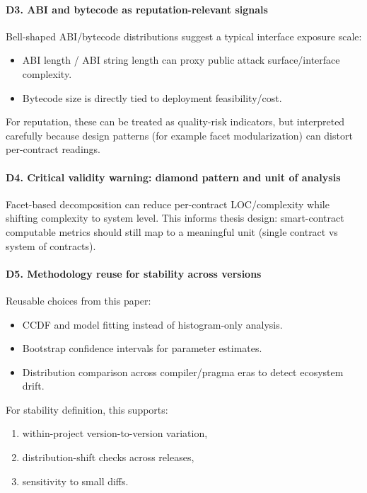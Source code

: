 \documentclass[11pt,a4paper]{article}
\begin{document}
\paragraph{D3. ABI and bytecode as reputation-relevant signals}
Bell-shaped ABI/bytecode distributions suggest a typical interface exposure scale:
\begin{itemize}[leftmargin=*]
  \item ABI length / ABI string length can proxy public attack surface/interface complexity.
  \item Bytecode size is directly tied to deployment feasibility/cost.
\end{itemize}
For reputation, these can be treated as quality-risk indicators, but interpreted carefully because design patterns (for example facet modularization) can distort per-contract readings.

\paragraph{D4. Critical validity warning: diamond pattern and unit of analysis}
Facet-based decomposition can reduce per-contract LOC/complexity while shifting complexity to system level. This informs thesis design: smart-contract computable metrics should still map to a meaningful unit (single contract vs system of contracts).

\paragraph{D5. Methodology reuse for stability across versions}
Reusable choices from this paper:
\begin{itemize}[leftmargin=*]
  \item CCDF and model fitting instead of histogram-only analysis.
  \item Bootstrap confidence intervals for parameter estimates.
  \item Distribution comparison across compiler/pragma eras to detect ecosystem drift.
\end{itemize}
For stability definition, this supports:
\begin{enumerate}[leftmargin=*]
  \item within-project version-to-version variation,
  \item distribution-shift checks across releases,
  \item sensitivity to small diffs.
\end{enumerate}
\end{document}
